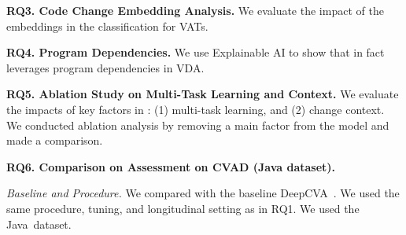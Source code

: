 







\vspace{1pt}
\noindent\textbf{RQ3. Code Change Embedding Analysis.} We evaluate the impact of the embeddings in the classification for VATs.

\noindent\textbf{RQ4. Program Dependencies.} We use
Explainable AI to show that {\tool} in fact leverages program
dependencies in VDA.



\vspace{1pt}
\noindent\textbf{RQ5. Ablation Study on Multi-Task Learning and
  Context.}  We evaluate the impacts of key factors in {\tool}: (1)
multi-task learning, and (2) change context. We conducted ablation analysis
by removing a main factor from the model and made a comparison.

\vspace{3pt}
\noindent\textbf{RQ6. Comparison on Assessment on CVAD (Java dataset).}

{\em Baseline and Procedure.} We compared {\tool} with the baseline
DeepCVA~\cite{deepCVA-ase21}. We used the same procedure, tuning, and
longitudinal setting as in RQ1. We used the Java~dataset.








